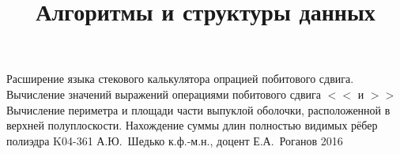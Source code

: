 \documentclass[a4paper,12pt]{memoir}
\def\+{\hskip 0.15mm}
\begin{document}
\renewcommand{\contentsname}{{\Large{Содержание}\hfill}}

\title{Алгоритмы и структуры данных}
{Расширение языка стекового калькулятора опрацией побитового сдвига.
Вычисление значений выражений операциями побитового сдвига  $<<$ и $>>$
Вычисление периметра и площади части выпуклой оболочки, расположенной в
верхней полуплоскости. Нахождение суммы длин полностью видимых рёбер полиэдра}
{K04-361}
{А.\+Ю.~Шедько}
{к.ф.-м.н., доцент}
{Е.\+А.~Роганов}
{2016}








\newpage


\end{document}
